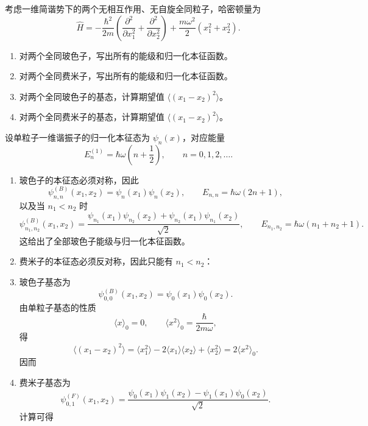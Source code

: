 \begin{question}
考虑一维简谐势下的两个无相互作用、无自旋全同粒子，哈密顿量为
\[
\hat H=-\frac{\hbar^2}{2m}\left(\frac{\partial^2}{\partial x_1^2}+\frac{\partial^2}{\partial x_2^2}\right)
+\frac{m\omega^2}{2}(x_1^2+x_2^2).
\]

\begin{enumerate}[label=(\arabic*),leftmargin=2.5em]
  \item 对两个全同玻色子，写出所有的能级和归一化本征函数。
  \item 对两个全同费米子，写出所有的能级和归一化本征函数。
  \item 对两个全同玻色子的基态，计算期望值 $\langle (x_1-x_2)^2\rangle$。
  \item 对两个全同费米子的基态，计算期望值 $\langle (x_1-x_2)^2\rangle$。
\end{enumerate}

\begin{solution}
设单粒子一维谐振子的归一化本征态为 $\psi_n(x)$，对应能量
\[
E_n^{(1)}=\hbar\omega\left(n+\frac12\right),\qquad n=0,1,2,\dots.
\]

\begin{enumerate}[label=(\arabic*),leftmargin=2.5em]
  \item 玻色子的本征态必须对称，因此
  \[
  \psi_{n,n}^{(B)}(x_1,x_2)=\psi_n(x_1)\psi_n(x_2),
  \qquad
  E_{n,n}=\hbar\omega(2n+1),
  \]
  以及当 $n_1<n_2$ 时
  \[
  \psi_{n_1,n_2}^{(B)}(x_1,x_2)=\frac{\psi_{n_1}(x_1)\psi_{n_2}(x_2)+\psi_{n_2}(x_1)\psi_{n_1}(x_2)}{\sqrt2},
  \qquad
  E_{n_1,n_2}=\hbar\omega(n_1+n_2+1).
  \]
  这给出了全部玻色子能级与归一化本征函数。

  \item 费米子的本征态必须反对称，因此只能有 $n_1<n_2$：

  \item 玻色子基态为
  \[
  \psi_{0,0}^{(B)}(x_1,x_2)=\psi_0(x_1)\psi_0(x_2).
  \]
  由单粒子基态的性质
  \[
  \langle x\rangle_0=0,
  \qquad
  \langle x^2\rangle_0=\frac{\hbar}{2m\omega},
  \]
  得
  \[
  \langle (x_1-x_2)^2\rangle
  =\langle x_1^2\rangle-2\langle x_1\rangle\langle x_2\rangle+\langle x_2^2\rangle
  =2\langle x^2\rangle_0.
  \]
  因而

  \item 费米子基态为
  \[
  \psi_{0,1}^{(F)}(x_1,x_2)=\frac{\psi_0(x_1)\psi_1(x_2)-\psi_1(x_1)\psi_0(x_2)}{\sqrt2}.
  \]
  计算可得
\end{enumerate}
\end{solution}
\end{question}

